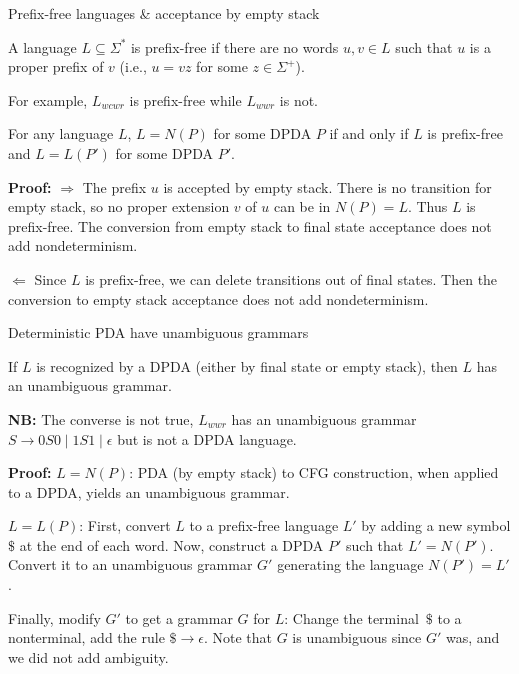 \documentclass[handout]{beamer}
\begin{document}
\begin{frame}{Prefix-free languages \& acceptance by empty stack}

    \begin{definition}
        A language $L\subseteq \Sigma^*$ is \alert{prefix-free} if there are no words $u,v\in L$ such that $u$ is a proper prefix of $v$ (i.e., $u=vz$ for some $z\in \Sigma^+$).
    \end{definition}
    \vspace{-8pt}
    For example, $L_{wcwr}$ is prefix-free while $L_{wwr}$ is not. %


    \begin{theorem}
        For any language $L$, $L=N(P)$ for some DPDA $P$ if and only if $L$ is prefix-free and $L=L(P')$ for some DPDA $P'$.
    \end{theorem}
    \vspace{-8pt}
    \textbf{Proof:}
    \alert{\Large$\Rightarrow$} The prefix $u$ is accepted by empty stack. There is no transition for empty stack, so no proper extension $v$ of $u$ can be in $N(P)=L$. Thus $L$ is prefix-free. The conversion from empty stack to final state acceptance does not add nondeterminism.
        
    \vspace{-3pt}    
    \alert{\Large$\Leftarrow$} Since $L$ is prefix-free, we can delete transitions out of final states. Then the conversion to empty stack acceptance does not add nondeterminism.\hfill\qedsymbol

\end{frame}


\begin{frame}{Deterministic PDA have unambiguous grammars}

    \begin{theorem}
        If $L$ is recognized by a DPDA (either by final state or empty stack), then $L$ has an unambiguous grammar.
    \end{theorem}
    \vspace{-9pt}
    \textbf{NB:} The converse is not true, $L_{wwr}$ has an unambiguous grammar $S\rightarrow 0S0 \mid 1S1 \mid \epsilon$ but is not a DPDA language.
        
    \vspace{-2pt}
    \textbf{Proof:}
    \alert{$L=N(P)$:} PDA (by empty stack) to CFG construction, when applied to a DPDA, yields an unambiguous grammar.

    \vspace{-2pt}
    \alert{$L=L(P)$:} First, convert $L$ to a prefix-free language $L'$ by adding a new symbol \alert{$\$$ at the end of each word}. Now, construct a DPDA $P'$ such that $L'=N(P')$. Convert it to an unambiguous grammar $G'$ generating the language $N(P')=L'$.
    
    \vspace{-2pt}
    Finally, modify $G'$ to get a grammar $G$ for  $L$: Change the terminal~$\$$ to a nonterminal, \alert{add the rule $\$\rightarrow \epsilon$}. Note that $G$ is unambiguous since $G'$ was, and we did not add ambiguity.\hfill\qedsymbol

\end{frame}
\end{document}

